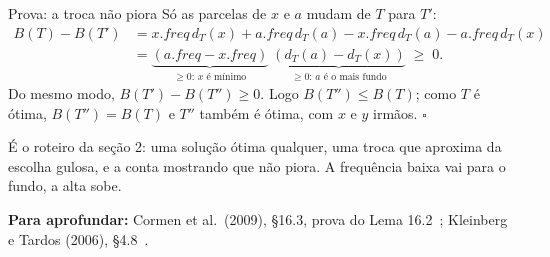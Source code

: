 \documentclass[aspectratio=169,xcolor=table]{beamer}
\newcommand{\fonte}[1]{%
  \vfill
  {\tiny\color{gray!55!black}\textbf{Para aprofundar:} #1\par}%
}
\begin{document}
\begin{frame}{Prova: a troca não piora}
  \small
  Só as parcelas de $x$ e $a$ mudam de $T$ para $T'$:
  \[
    \begin{aligned}
    B(T) - B(T') &= x.\mathit{freq}\, d_T(x) + a.\mathit{freq}\, d_T(a)
                  - x.\mathit{freq}\, d_T(a) - a.\mathit{freq}\, d_T(x) \\
                 &= \underbrace{(a.\mathit{freq} - x.\mathit{freq})}_{\ge 0\text{: $x$ é mínimo}}
                    \;\underbrace{(d_T(a) - d_T(x))}_{\ge 0\text{: $a$ é o mais fundo}}
                 \;\ge\; 0 .
    \end{aligned}
  \]
  Do mesmo modo, $B(T') - B(T'') \ge 0$. Logo $B(T'') \le B(T)$; como $T$ é ótima,
  $B(T'') = B(T)$ e $T''$ também é ótima, com $x$ e $y$ irmãos. \hfill$\square$
  \medskip

  {\scriptsize É o roteiro da seção 2: uma solução ótima qualquer, uma troca que aproxima
  da escolha gulosa, e a conta mostrando que não piora. A frequência baixa vai para o fundo,
  a alta sobe.\par}
  \fonte{Cormen et al.\ (2009), \S 16.3, prova do Lema 16.2~\cite{cormen2009introduction};
    Kleinberg e Tardos (2006), \S 4.8~\cite{kleinberg2006algorithm}.}
\end{frame}
\end{document}
